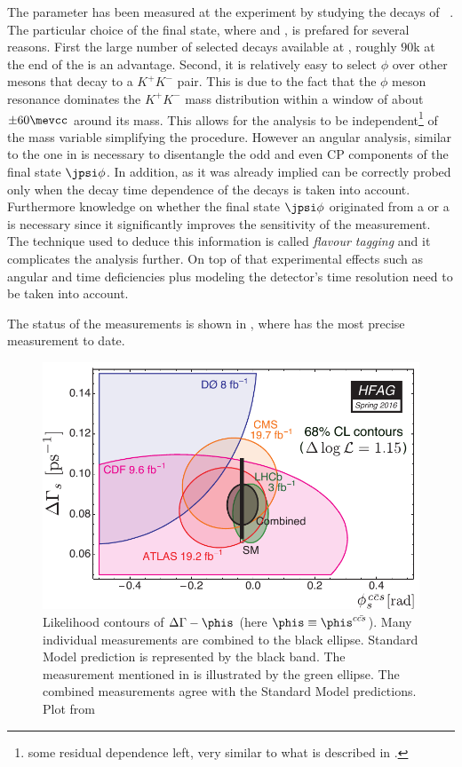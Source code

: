 The parameter \phis has been measured at the \lhcb experiment by studying the decays of \BsJpsiPhi~\cite{phis-3fb-paper}.
The particular choice of the final state, where \phiKK and \Jpsimumu, is prefared for several reasons. First the large number
of selected \BsJpsiPhi decays available at \lhcb, roughly $90$k at the end of the \runtwo is an advantage. Second, it is relatively
easy to select $\phi$ over other mesons that decay to a $K^+K^-$ pair. This is due to the fact that the $\phi$ meson resonance dominates
the $K^+K^-$ mass distribution within a window of about $\pm 60 \mevcc$ around its mass. This allows for the analysis to be
independent\footnote{some residual dependence left, very similar to what is described in . }
of the \mkk mass variable simplifying the procedure. However an angular analysis, similar to the one in  is necessary
to disentangle the odd and even CP components of the final state $\jpsi\phi$.
In addition, as it was already implied \phis can be correctly probed only when the decay time dependence of the \BsJpsiPhi decays is taken into
account. Furthermore knowledge on whether the final state $\jpsi\phi$ originated from a \Bs or a \Bsb is necessary since it
significantly improves the sensitivity of the \phis measurement. The technique used to deduce this information is called {\it flavour tagging}
and it complicates the analysis further. On top of that experimental effects such as angular and time deficiencies plus modeling the
\lhcb detector's time resolution need to be taken into account.

The status of the \phis measurements is shown in , where \lhcb has the most precise measurement to date.

\begin{figure}[!h]
  \centering
    \includegraphics[trim=0cm 0cm 0cm 0cm, clip=true, scale=0.8]{Figures/Chapter1/hfag_Spring2016_DGsphis_zoom.pdf}
    \caption{Likelihood contours of $\Delta\Gamma-\phis$ (here $\phis\equiv \phis^{c\bar{cs}}$). Many individual measurements are
             combined to the black ellipse. Standard Model prediction is represented by the black band. The \lhcb measurement
             mentioned in  is illustrated by the green ellipse. The combined measurements agree with the Standard Model
             predictions. Plot from \cite{hfag-2014} }
    \label{hfag_phis_dg}
\end{figure}

